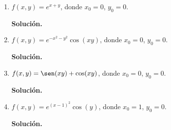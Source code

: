 \documentclass[fleqn, 12pt]{article}
\begin{document}
\begin{enumerate}
        \item $ f(x,y) = e^{x + y} $, donde $ x_0 = 0 $, $ y_0 = 0 $.
        
        \textbf{Solución.}


        \item $ f(x,y) = e^{-x^2 - y^2} \cos (xy) $, donde $ x_0 = 0 $, $ y_0 = 0 $.
        
        \textbf{Solución.}


        \item $ f(x,y) = \sen (xy) + \cos (xy) $, donde $ x_0 = 0 $, $ y_0 = 0 $.
        
        \textbf{Solución.}


        \item $ f(x,y) = e^{(x - 1)^2} \cos (y) $, donde $ x_0 = 1 $, $ y_0 = 0 $.
        
        \textbf{Solución.}


    \end{enumerate}
\end{document}
